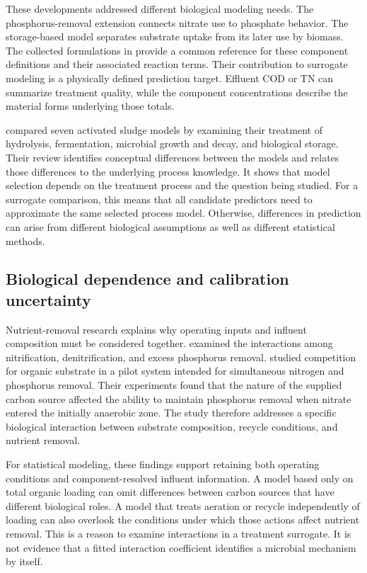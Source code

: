 These developments addressed different biological modeling needs. The phosphorus-removal extension connects nitrate use to phosphate behavior. The storage-based model separates substrate uptake from its later use by biomass. The collected formulations in \citet{Henze2006} provide a common reference for these component definitions and their associated reaction terms. Their contribution to surrogate modeling is a physically defined prediction target. Effluent COD or TN can summarize treatment quality, while the component concentrations describe the material forms underlying those totals.

\citet{Hauduc2013} compared seven activated sludge models by examining their treatment of hydrolysis, fermentation, microbial growth and decay, and biological storage. Their review identifies conceptual differences between the models and relates those differences to the underlying process knowledge. It shows that model selection depends on the treatment process and the question being studied. For a surrogate comparison, this means that all candidate predictors need to approximate the same selected process model. Otherwise, differences in prediction can arise from different biological assumptions as well as different statistical methods.

\subsection{Biological dependence and calibration uncertainty}

Nutrient-removal research explains why operating inputs and influent composition must be considered together. \citet{Wentzel1992} examined the interactions among nitrification, denitrification, and excess phosphorus removal. \citet{Guerrero2011} studied competition for organic substrate in a pilot system intended for simultaneous nitrogen and phosphorus removal. Their experiments found that the nature of the supplied carbon source affected the ability to maintain phosphorus removal when nitrate entered the initially anaerobic zone. The study therefore addresses a specific biological interaction between substrate composition, recycle conditions, and nutrient removal.

For statistical modeling, these findings support retaining both operating conditions and component-resolved influent information. A model based only on total organic loading can omit differences between carbon sources that have different biological roles. A model that treats aeration or recycle independently of loading can also overlook the conditions under which those actions affect nutrient removal. This is a reason to examine interactions in a treatment surrogate. It is not evidence that a fitted interaction coefficient identifies a microbial mechanism by itself.

